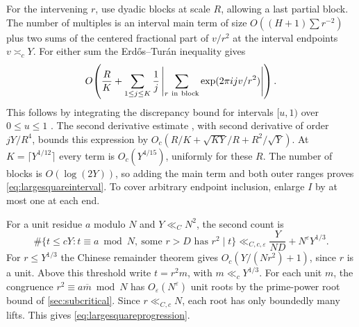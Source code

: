 \documentclass[11pt,a4paper]{article}
\numberwithin{equation}{section}
\begin{document}
For the intervening $r$, use dyadic blocks at scale $R$,
allowing a last partial block. The number of multiples is
an interval main term of size $O((H+1)\sum r^{-2})$
plus two sums of the centered fractional part of $v/r^2$
at the interval endpoints $v\asymp_c Y$.
For either sum the Erd\H{o}s--Tur\'an inequality gives
\[
 O\!\left(\frac{R}{K}
       +\sum_{1\le j\le K}\frac1j
          \left|\sum_{r\ {\rm in\ block}}
                   \exp(2\pi i jv/r^2)\right|\right).
\]
This follows by integrating the discrepancy bound for
intervals $[u,1)$ over $0\le u\le1$
\cite[pp.~112--113]{KuipersNiederreiter}.
The second derivative estimate
\cite[Theorem~2.2]{GrahamKolesnik}, with second derivative
of order $jY/R^4$, bounds this expression by
$O_c(R/K+\sqrt{KY}/R+R^2/\sqrt Y)$.
At $K=\lceil Y^{1/12}\rceil$ every term is
$O_c(Y^{4/15})$, uniformly for these $R$.
The number of blocks is $O(\log(2Y))$, so adding the
main term and both outer ranges proves
\cref{eq:largesquareinterval}. To cover arbitrary
endpoint inclusion, enlarge $I$ by at most one at each end.

For a unit residue $a$ modulo $N$ and $Y\ll_C N^2$,
the second count is
\begin{equation}
 \#\{t\le cY:t\equiv a\bmod N,\
                      \text{some }r>D\text{ has }r^2\mid t\}
       \ll_{C,c,\varepsilon}\frac{Y}{ND}
                               +N^\varepsilon Y^{1/3}.
 \label{eq:largesquareprogression}
\end{equation}
For $r\le Y^{1/3}$ the Chinese remainder theorem gives
$O_c(Y/(Nr^2)+1)$, since $r$ is a unit. Above this
threshold write $t=r^2m$, with $m\ll_c Y^{1/3}$.
For each unit $m$, the congruence
$r^2\equiv a\overline m\bmod N$ has $O_\varepsilon(N^\varepsilon)$
unit roots by the prime-power root bound of
\cref{sec:subcritical}. Since $r\ll_{C,c}N$, each root
has only boundedly many lifts. This gives
\cref{eq:largesquareprogression}.
\end{document}
